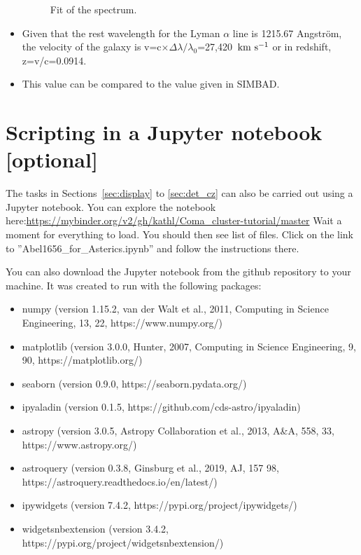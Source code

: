 \documentclass [a4paper, 12pt]{article}
\def\kms{\rm km\ s^{-1}}
\newcommand{\simbad}{{\textsc{SIMBAD}}}
\begin{document}
\begin{itemize}
\begin{figure}[H]
\caption{Fit of the spectrum.}
\label{fig:specfit}
\end{figure}
\item Given that the rest wavelength for the Lyman $\alpha$ line is 1215.67 Angstr\"om, the velocity of the galaxy is v=c$\times\Delta\lambda/\lambda_0$=27,420~$\kms$ or in redshift, z=v/c=0.0914.

\item This value can be compared to the value given in \simbad.
\end{itemize}
 
\section{Scripting in a Jupyter notebook [optional]}

The tasks in Sections~\ref{sec:display} to \ref{sec:det_cz} can also be carried 
out using a Jupyter notebook. You can explore the notebook 
here:\url{https://mybinder.org/v2/gh/kathl/Coma_cluster-tutorial/master} Wait a 
moment 
for everything to load. You should then see list of files. Click
on the link to ”Abel1656\_for\_Asterics.ipynb” and follow the instructions 
there.

You can also download the Jupyter notebook from the github repository to your 
machine. It was created to run with the following packages:
\begin{itemize}
    \item numpy (version 1.15.2, van der Walt et al., 2011, Computing in 
    Science Engineering, 13, 22, https://www.numpy.org/)
    \item matplotlib (version 3.0.0, Hunter, 2007, Computing in Science 
    Engineering, 9, 90, https://matplotlib.org/)
    \item seaborn (version 0.9.0, https://seaborn.pydata.org/)
    \item ipyaladin (version 0.1.5, https://github.com/cds-astro/ipyaladin)
    \item astropy (version 3.0.5, Astropy Collaboration et al., 2013, A\&A, 
    558, 33, https://www.astropy.org/)
    \item astroquery (version 0.3.8, Ginsburg et al., 2019, AJ, 157 98, 
    https://astroquery.readthedocs.io/en/latest/)
    \item ipywidgets (version 7.4.2, https://pypi.org/project/ipywidgets/)
    \item widgetsnbextension (version 3.4.2, 
    https://pypi.org/project/widgetsnbextension/)
\end{itemize}

%
\end{document}
